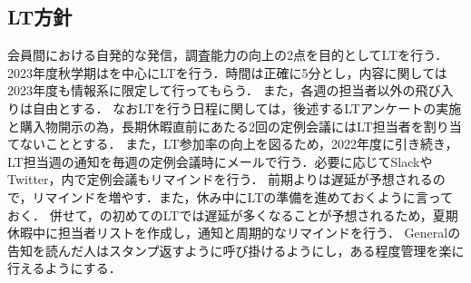 
\subsection*{LT方針}


会員間における自発的な発信，調査能力の向上の2点を目的としてLTを行う．
2023年度秋学期は\firstGrade{}を中心にLTを行う．時間は正確に5分とし，内容に関しては2023年度も情報系に限定して行ってもらう．
また，各週の担当者以外の飛び入りは自由とする．
なおLTを行う日程に関しては，後述するLTアンケートの実施と購入物開示の為，長期休暇直前にあたる2回の定例会議にはLT担当者を割り当てないこととする．
また，LT参加率の向上を図るため，2022年度に引き続き，LT担当週の通知を毎週の定例会議時にメールで行う．必要に応じてSlackやTwitter，内で定例会議もリマインドを行う．
前期よりは遅延が予想されるので，リマインドを増やす．また，休み中にLTの準備を進めておくように言っておく．
併せて，\firstGrade{}の初めてのLTでは遅延が多くなることが予想されるため，夏期休暇中に担当者リストを作成し，通知と周期的なリマインドを行う．
Generalの告知を読んだ人はスタンプ返すように呼び掛けるようにし，ある程度管理を楽に行えるようにする．
